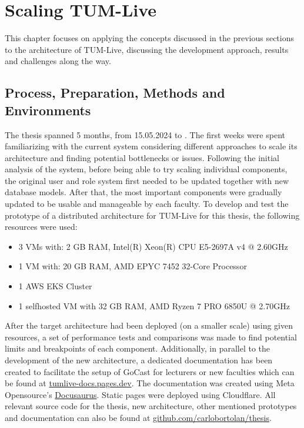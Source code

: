 
\chapter{Scaling TUM-Live}\label{chapter:scaling_tumlive}

This chapter focuses on applying the concepts discussed in the previous sections to the architecture of TUM-Live, discussing the development approach, results and challenges along the way. 

\section{Process, Preparation, Methods and Environments}

The thesis spanned 5 months, from 15.05.2024 to \getSubmissionDate{}. The first weeks were spent familiarizing with the current system considering different approaches to scale its architecture and finding potential bottlenecks or issues. Following the initial analysis of the system, before being able to try scaling individual components, the original user and role system first needed to be updated together with new database models. After that, the most important components were gradually updated to be usable and manageable by each faculty. 
To develop and test the prototype of a distributed architecture for TUM-Live for this thesis, the following resources were used:
\begin{itemize}
    \item 3 \ac{VM}s with: 2 GB RAM, Intel(R) Xeon(R) CPU E5-2697A v4 @ 2.60GHz
    \item 1 \ac{VM} with: 20 GB RAM, AMD EPYC 7452 32-Core Processor
    \item 1 \ac{AWS} \ac{EKS} Cluster
    \item 1 selfhosted \ac{VM} with 32 GB RAM, AMD Ryzen 7 PRO 6850U @ 2.70GHz
\end{itemize}

After the target architecture had been deployed (on a smaller scale) using given resources, a set of performance tests and comparisons was made to find potential limits and breakpoints of each component. 
Additionally, in parallel to the development of the new architecture, a dedicated documentation has been created to facilitate the setup of GoCast for lecturers or new faculties which can be found at \href{https://tumlive-docs.pages.dev/}{tumlive-docs.pages.dev}. The documentation was created using Meta Opensource's \href{https://github.com/facebook/docusaurus}{Docusaurus}. Static pages were deployed using Cloudflare.
All relevant source code for the thesis, new architecture, other mentioned prototypes and documentation can also be found at \href{https://github.com/carlobortolan/thesis}{github.com/carlobortolan/thesis}.

